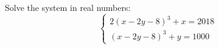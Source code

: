 Solve the system in real numbers:
\[\begin{cases}2(x-2y-8)^3+x=2018\\(x-2y-8)^3+y=1000\end{cases}\]
